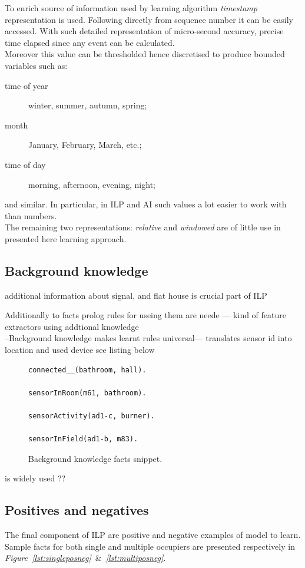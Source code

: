 \documentclass[12pt, a4paper, pdflatex, leqno, twoside, openright]{report}
\begin{document}
To enrich source of information used by learning algorithm \emph{timestamp} representation is used. Following directly from sequence number it can be easily accessed. With such detailed representation of micro-second accuracy, precise time elapsed since any event can be calculated.\\
Moreover this value can be thresholded hence discretised to produce bounded variables such as:
\begin{description}
\item[time of year] winter, summer, autumn, spring;
\item[month] January, February, March, etc.;
\item[time of day] morning, afternoon, evening, night;
\end{description}
and similar. In particular, in ILP and AI such values a lot easier to work with than numbers.\\

The remaining two representations: \emph{relative} and \emph{windowed} are of little use in presented here learning approach.

    \subsection{Background knowledge}
additional information about signal, and flat house
is crucial part of ILP

Additionally to facts prolog rules for useing them are neede --- kind of feature extractors using addtional knowledge\\

--Background knowledge makes learnt rules universal--- translates sensor id into location and used device see listing below

\begin{figure}[htb] %
  \begin{verbatim}
connected__(bathroom, hall).

sensorInRoom(m61, bathroom).

sensorActivity(ad1-c, burner).

sensorInField(ad1-b, m83).
  \end{verbatim}
  \caption{Background knowledge facts snippet.\label{lst:bg}}
\end{figure}

is widely used ??

    \subsection{Positives and negatives}
The final component of ILP are positive and negative examples of model to learn. Sample facts for both single and multiple occupiers are presented respectively in \emph{Figure~\ref{lst:singleposneg}}~\&~\emph{\ref{lst:multiposneg}}.\\
\end{document}

